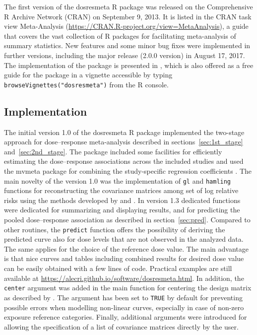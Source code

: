 \documentclass[11pt,a4paper,twoside,openany]{book}\usepackage{knitr}
\newcommand{\pkg}[1]{{\fontseries{b}\selectfont #1}}
\begin{document}
{The first version of the \pkg{dosresmeta} \textsf{R} package was released on the Comprehensive R Archive Network (CRAN) on September 9, 2013. It is listed in the CRAN task view Meta-Analysis (\url{https://CRAN.R-project.org/view=MetaAnalysis}), a guide that covers the vast collection of \textsf{R} packages for facilitating meta-analysis of summary statistics.
New features and some minor bug fixes were implemented in further versions, including the major release (2.0.0 version) in August 17, 2017. The implementation of the package is presented in , which is also offered as a free guide for the package in a vignette accessible by typing \texttt{browseVignettes("dosresmeta")} from the \textsf{R} console.

\subsection{Implementation}

The initial version 1.0 of the \pkg{dosresmeta} \textsf{R} package implemented the two-stage approach for dose--response meta-analysis described in sections~\ref{sec:1st_stage} and~\ref{sec:2nd_stage}. The package included some facilities for efficiently estimating the dose--response associations across the included studies and used the \pkg{mvmeta} package for combining the study-specific regression coefficients \citep{gasparrini2012multivariate}. The main novelty of the version 1.0 was the implementation of \texttt{gl} and \texttt{hamling} functions for reconstructing the covariance matrices among set of log relative risks using the methods developed by \cite{greenland1992methods} and \cite{hamling2008facilitating}. 
In version 1.3 dedicated functions were dedicated for summarizing and displaying results, and for predicting the pooled dose--response association as described in section~\ref{sec:pred}. Compared to other routines, the \texttt{predict} function offers the possibility of deriving the predicted curve also for dose levels that are not observed in the analyzed data. The same applies for the choice of the reference dose value. The main advantage is that nice curves and tables including combined results for desired dose value can be easily obtained with a few lines of code. Practical examples are still available at \url{https://alecri.github.io/software/dosresmeta.html}.
In addition, the \texttt{center} argument was added in the main function for centering the design matrix as described by \cite{liu2009two}. The argument has been set to \texttt{TRUE} by default for preventing possible errors when modelling non-linear curves, especially in case of non-zero exposure reference categories. Finally, additional arguments were introduced for allowing the specification of a list of covariance matrices directly by the user.

}
\end{document}
